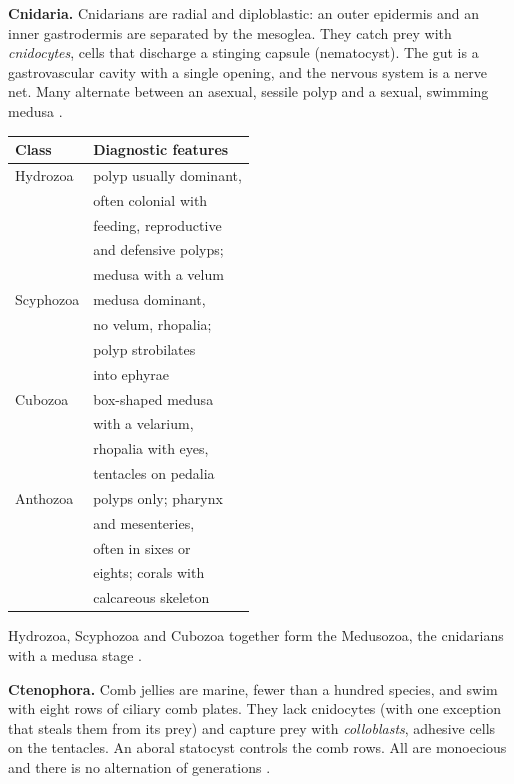 \textbf{Cnidaria.} Cnidarians are radial and
diploblastic: an outer epidermis and an inner
gastrodermis are separated by the mesoglea.
They catch prey with \emph{cnidocytes}, cells
that discharge a stinging capsule
(nematocyst). The gut is a gastrovascular
cavity with a single opening, and the nervous
system is a nerve net. Many alternate between
an asexual, sessile polyp and a sexual,
swimming medusa \cite[Chapter
7]{hickman2002animal}.

\begin{center}
\begin{tabular}{ll}
Class & Diagnostic features \\
\hline
Hydrozoa & polyp usually dominant, \\
& often colonial with \\
& feeding, reproductive \\
& and defensive polyps; \\
& medusa with a velum \\
Scyphozoa & medusa dominant, \\
& no velum, rhopalia; \\
& polyp strobilates \\
& into ephyrae \\
Cubozoa & box-shaped medusa \\
& with a velarium, \\
& rhopalia with eyes, \\
& tentacles on pedalia \\
Anthozoa & polyps only; pharynx \\
& and mesenteries, \\
& often in sixes or \\
& eights; corals with \\
& calcareous skeleton \\
\end{tabular}
\end{center}

Hydrozoa, Scyphozoa and Cubozoa together form
the Medusozoa, the cnidarians with a medusa
stage \cite{gasca2014medusozoa}.

\textbf{Ctenophora.} Comb jellies are marine,
fewer than a hundred species, and swim with
eight rows of ciliary comb plates. They lack
cnidocytes (with one exception that steals
them from its prey) and capture prey with
\emph{colloblasts}, adhesive cells on the
tentacles. An aboral statocyst controls the
comb rows. All are monoecious and there is no
alternation of generations \cite[Chapter
7]{hickman2002animal}.

